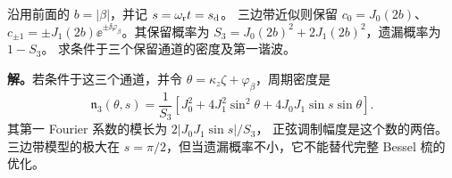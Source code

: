\begin{exbox}[三边带截断的归一化与第一谐波]
沿用前面的 $b=|\beta|$，并记 $s=\omega_{\rm r}t=s_{\rm d}$。
三边带近似则保留 $c_0=J_0(2b)$、$c_{\pm1}=\pm J_1(2b)
\ee^{\pm\ii\varphi_\beta}$。其保留概率为
$S_3=J_0(2b)^2+2J_1(2b)^2$，遗漏概率为 $1-S_3$。
求条件于三个保留通道的密度及第一谐波。

\textbf{解。}若条件于这三个通道，并令 $\theta=\kappa_z\zeta+\varphi_\beta$，周期密度是
\begin{equation}
\mathfrak n_3(\theta,s)=\frac{1}{S_3}
\left[J_0^2+4J_1^2\sin^2\theta
+4J_0J_1\sin s\sin\theta\right].
\label{eq:feqo-three-sideband-density}
\end{equation}
其第一 Fourier 系数的模长为 $2|J_0J_1\sin s|/S_3$，
正弦调制幅度是这个数的两倍。
三边带模型的极大在 $s=\pi/2$，但当遗漏概率不小，它不能替代完整 Bessel 梳的优化。
\end{exbox}

